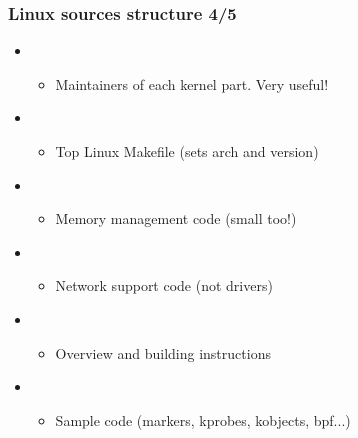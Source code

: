 \begin{frame}
  \frametitle{Linux sources structure 4/5}
  \begin{itemize}
  \item {}
    \begin{itemize}
    \item Maintainers of each kernel part. Very useful!
    \end{itemize}
  \item {}
    \begin{itemize}
    \item Top Linux Makefile (sets arch and version)
    \end{itemize}
  \item {}
    \begin{itemize}
    \item Memory management code (small too!)
    \end{itemize}
  \item {}
    \begin{itemize}
    \item Network support code (not drivers)
    \end{itemize}
  \item {}
    \begin{itemize}
    \item Overview and building instructions
    \end{itemize}
  \item {}
    \begin{itemize}
    \item Sample code (markers, kprobes, kobjects, bpf...)
    \end{itemize}
  \end{itemize}
\end{frame}

